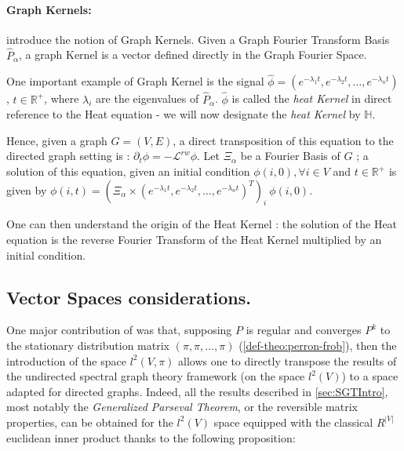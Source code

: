 \documentclass[sn-mathphys]{sn-jnl}%
\theoremstyle{thmstyleone}%
\theoremstyle{thmstyletwo}%
\theoremstyle{thmstylethree}%
\begin{document}
\paragraph{Graph Kernels:} \label{par:graph_kernel}

\cite{shuman_narang_frossard_ortega_vandergheynst_2013} introduce the
notion of Graph Kernels. Given a Graph Fourier Transform Basis
$\hat{P}_\alpha$, a graph Kernel is a vector defined directly in the
Graph Fourier Space.

One important example of Graph Kernel is the signal $\hat{\phi} = (e^{-\lambda_1 t}, e^{-\lambda_2 t}, \hdots, e^{-\lambda_n t})$, $t \in \mathbb{R^+}$, where $\lambda_i$ are the eigenvalues of $\hat{P}_\alpha$.
$\hat{\phi}$ is called the \textit{heat Kernel} in direct reference to the Heat equation - we will now designate the \textit{heat Kernel} by $\mathbb{H}$.

Hence, given a graph $G=(V,E)$, a direct transposition of this
equation to the directed graph setting is :
$\partial_{t} \phi = - \mathcal{L}^{rw} \phi$. Let $\Xi_\alpha$ be a
Fourier Basis of $G$ ; a solution of this equation, given an initial
condition $\phi(i,0), \forall i \in V$ and $t \in \mathbb{R}^+$ is
given by
$\phi(i, t) = (\Xi_\alpha \times (e^{-\lambda_1 t}, e^{-\lambda_2 t},
\hdots, e^{-\lambda_n t})^T)_i \ \phi(i, 0)$.

One can then understand the origin of the Heat Kernel : the solution
of the Heat equation is the reverse Fourier Transform of the Heat
Kernel multiplied by an initial condition.


\subsection{Vector Spaces considerations.}\label{subsec:vector_spaces_relation}
One major contribution of \cite{sevi2019} was that, supposing $P$ is
regular and converges $P^k$ to the stationary distribution matrix
$(\pi, \pi, \hdots, \pi)$ (\ref{def-theo:perron-frob}), then the
introduction of the space $l^2(V, \pi)$ allows one to directly
transpose the results of the undirected spectral graph theory
framework (on the space $l^2(V)$) to a space adapted for directed
graphs. Indeed, all the results described in \ref{sec:SGTIntro}, most
notably the \textit{Generalized Parseval Theorem}, or the reversible
matrix properties, can be obtained for the $l^2(V)$ space equipped
with the classical $R^{|V|}$ euclidean inner product thanks to the
following proposition:
\end{document}
